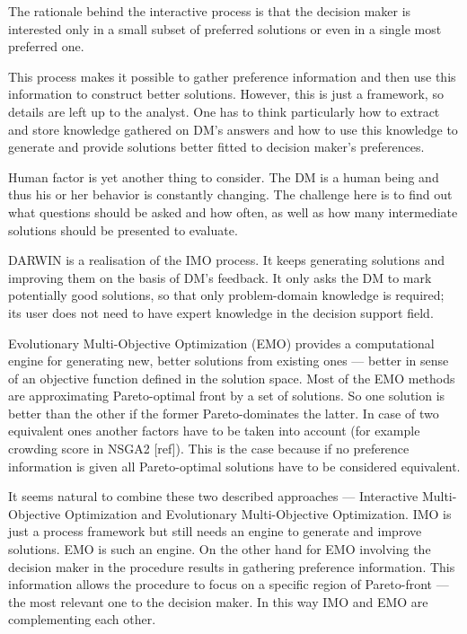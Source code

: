 The rationale behind the interactive process is that the decision maker is
interested only in a small subset of preferred solutions or even in a single
most preferred one.

This process makes it possible to gather preference information and then use
this information to construct better solutions. However, this is just a
framework, so details are left up to the analyst. One has to think
particularly how to extract and store knowledge gathered on DM's answers and
how to use this knowledge to generate and provide solutions better fitted to
decision maker's preferences.

Human factor is yet another thing to consider. The DM is a human being and
thus his or her behavior is constantly changing. The challenge here is to find
out what questions should be asked and how often, as well as how many
intermediate solutions should be presented to evaluate.

DARWIN is a realisation of the IMO process. It keeps generating solutions and
improving them on the basis of DM's feedback. It only asks the DM to mark
potentially good solutions, so that only problem-domain knowledge is required;
its user does not need to have expert knowledge in the decision support field.

Evolutionary Multi-Objective Optimization (EMO) provides a computational
engine for generating new, better solutions from existing ones --- better in
sense of an objective function defined in the solution space. Most of the EMO
methods are approximating Pareto-optimal front by a set of solutions. So one
solution is better than the other if the former Pareto-dominates the
latter. In case of two equivalent ones another factors have to be taken into
account (for example crowding score in NSGA2 [ref]). This is the case because
if no preference information is given all Pareto-optimal solutions have to be
considered equivalent.

It seems natural to combine these two described approaches --- Interactive
Multi-Objective Optimization and Evolutionary Multi-Objective
Optimization. IMO is just a process framework but still needs an engine to
generate and improve solutions. EMO is such an engine. On the other hand for
EMO involving the decision maker in the procedure results in gathering
preference information. This information allows the procedure to focus on a
specific region of Pareto-front --- the most relevant one to the decision
maker. In this way IMO and EMO are complementing each other.

